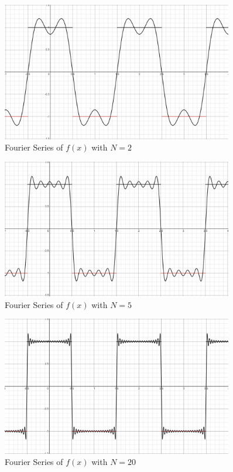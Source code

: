 \documentclass{report}
\begin{document}
\begin{figure}[H]
    \centering
    \includegraphics[width=0.9\textwidth]{images/fourier_series/fourier_2.png}
    \caption{Fourier Series of $f(x)$ with $N=2$}
\end{figure}

\begin{figure}[H]
    \centering
    \includegraphics[width=0.9\textwidth]{images/fourier_series/fourier_5.png}
    \caption{Fourier Series of $f(x)$ with $N=5$}
\end{figure}

\begin{figure}[H]
    \centering
    \includegraphics[width=0.9\textwidth]{images/fourier_series/fourier_20.png}
    \caption{Fourier Series of $f(x)$ with $N=20$}
\end{figure}
\end{document}
